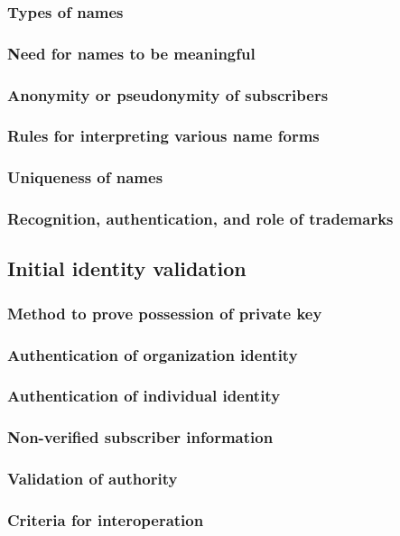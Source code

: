\documentclass[10pt]{article}
\begin{document}
\subsubsection{Types of names}
\subsubsection{Need for names to be meaningful}
\subsubsection{Anonymity or pseudonymity of subscribers}
\subsubsection{Rules for interpreting various name forms}
\subsubsection{Uniqueness of names}
\subsubsection{Recognition, authentication, and role of trademarks}
\subsection{Initial identity validation}
\subsubsection{Method to prove possession of private key}
\subsubsection{Authentication of organization identity}
\subsubsection{Authentication of individual identity}
\subsubsection{Non-verified subscriber information}
\subsubsection{Validation of authority}
\subsubsection{Criteria for interoperation}
\end{document}
